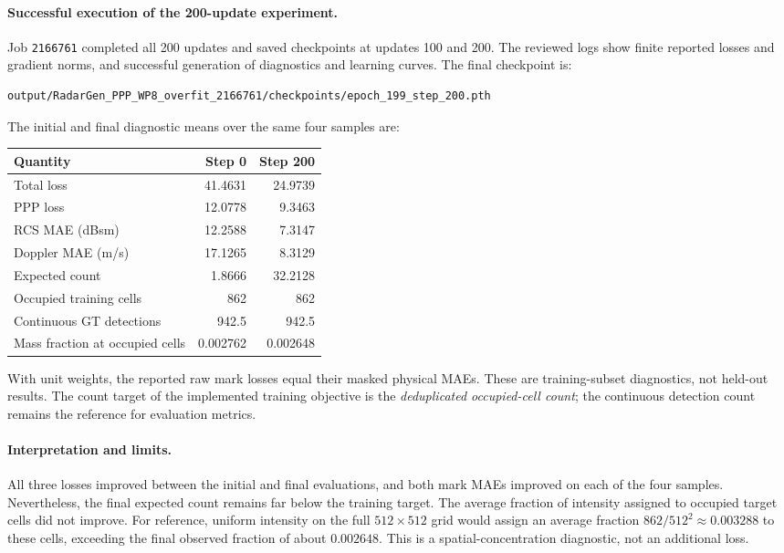 \documentclass[11pt,a4paper]{article}
\begin{document}
\paragraph{Successful execution of the 200-update experiment.}
Job \texttt{2166761} completed all 200 updates and saved checkpoints at
updates 100 and 200. The reviewed logs show finite reported losses and
gradient norms, and successful generation of diagnostics and learning
curves. The final checkpoint is:
\begin{lstlisting}
output/RadarGen_PPP_WP8_overfit_2166761/checkpoints/epoch_199_step_200.pth
\end{lstlisting}
The initial and final diagnostic means over the same four samples are:
\begin{center}
\begin{tabular}{lrr}
\toprule
Quantity & Step 0 & Step 200 \\
\midrule
Total loss & 41.4631 & 24.9739 \\
PPP loss & 12.0778 & 9.3463 \\
RCS MAE (dBsm) & 12.2588 & 7.3147 \\
Doppler MAE (m/s) & 17.1265 & 8.3129 \\
Expected count & 1.8666 & 32.2128 \\
Occupied training cells & 862 & 862 \\
Continuous GT detections & 942.5 & 942.5 \\
Mass fraction at occupied cells & 0.002762 & 0.002648 \\
\bottomrule
\end{tabular}
\end{center}
With unit weights, the reported raw mark losses equal their masked
physical MAEs. These are training-subset diagnostics, not held-out results.
The count target of the implemented training objective is the
\emph{deduplicated occupied-cell count}; the continuous detection count
remains the reference for evaluation metrics.

\paragraph{Interpretation and limits.}
All three losses improved between the initial and final evaluations,
and both mark MAEs improved on each of the four samples. Nevertheless,
the final expected count remains far below the training target. The
average fraction of intensity assigned to occupied target cells did not
improve. For reference, uniform intensity on the full $512\times512$
grid would assign an average fraction $862/512^2\approx0.003288$ to
these cells, exceeding the final observed fraction of about $0.002648$.
This is a spatial-concentration diagnostic, not an additional loss.
\end{document}

